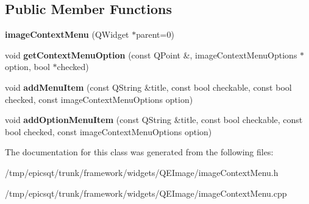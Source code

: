 \subsection*{Public Member Functions}
\begin{DoxyCompactItemize}
\item 
\hypertarget{classimageContextMenu_a74a2d31c09f2d410ea3d1e5b6f631530}{
{\bfseries imageContextMenu} (QWidget $\ast$parent=0)}
\label{classimageContextMenu_a74a2d31c09f2d410ea3d1e5b6f631530}

\item 
\hypertarget{classimageContextMenu_a5f57af407bdd1d3bc5e8b9b22ac573ab}{
void {\bfseries getContextMenuOption} (const QPoint \&, imageContextMenuOptions $\ast$option, bool $\ast$checked)}
\label{classimageContextMenu_a5f57af407bdd1d3bc5e8b9b22ac573ab}

\item 
\hypertarget{classimageContextMenu_a92f602856915fa4717ca23f1ee56e5a5}{
void {\bfseries addMenuItem} (const QString \&title, const bool checkable, const bool checked, const imageContextMenuOptions option)}
\label{classimageContextMenu_a92f602856915fa4717ca23f1ee56e5a5}

\item 
\hypertarget{classimageContextMenu_af34ef9194140b925c833b78d93d27db0}{
void {\bfseries addOptionMenuItem} (const QString \&title, const bool checkable, const bool checked, const imageContextMenuOptions option)}
\label{classimageContextMenu_af34ef9194140b925c833b78d93d27db0}

\end{DoxyCompactItemize}


The documentation for this class was generated from the following files:\begin{DoxyCompactItemize}
\item 
/tmp/epicsqt/trunk/framework/widgets/QEImage/imageContextMenu.h\item 
/tmp/epicsqt/trunk/framework/widgets/QEImage/imageContextMenu.cpp\end{DoxyCompactItemize}
